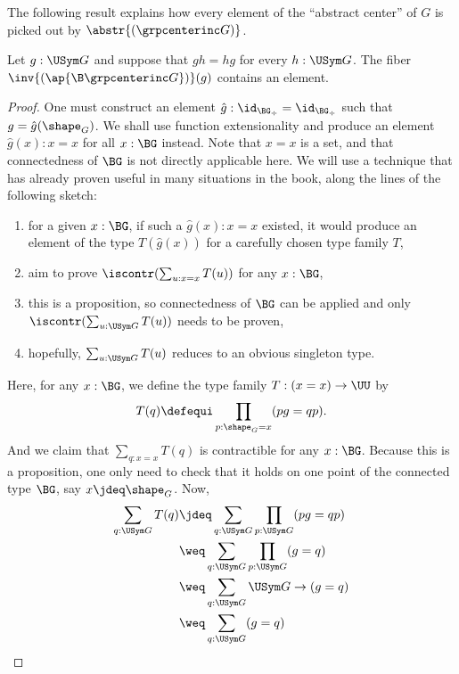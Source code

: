 The following result explains how every element of the ``abstract
center'' of $G$ is picked out by $\abstr{(\grpcenterinc G)}$.
\begin{lemma}
  \label{lemma:center-inc-surj-on-paths}%
  Let $g:\USym G$ and suppose that $gh=hg$ for every
  $h:\USym G$. The fiber $\inv{(\ap {\B\grpcenterinc G})}(g)$ contains
  an element.
\end{lemma}
\begin{proof}
  One must construct an element
  $\hat g:\id_{\BG_\div} = \id_{\BG_\div}$ such that
  $g=\hat g(\shape_G)$. We shall use function extensionality and produce
  an element $\hat g(x):x=x$ for all $x:\BG$ instead. Note that $x=x$
  is a set, and that connectedness of $\BG$ is not directly applicable
  here. We will use a technique that has already proven useful in many
  situations in the book, along the lines of the following sketch:
  \begin{enumerate}
  \item for a given $x:\BG$, if such a $\hat g(x):x=x$ existed, it would
    produce an element of the type $T(\hat g(x))$ for a carefully chosen type
    family $T$,
  \item aim to prove $\iscontr(\sum_{u:x=x}T(u))$ for any $x:\BG$,
  \item this is a proposition, so connectedness of $\BG$ can be applied
    and only $\iscontr(\sum_{u:\USym G}T(u))$ needs to be proven,
  \item hopefully, $\sum_{u:\USym G}T(u)$ reduces to an obvious
    singleton type.
  \end{enumerate}
  Here, for any $x:\BG$, we define the type family $T: (x=x) \to \UU$
  by
  \begin{displaymath}
    T(q) \defequi \prod_{p:\shape_G=x} (pg=qp).
  \end{displaymath}
  And we claim that $\sum_{q:x=x}T(q)$ is contractible for any
  $x:\BG$. Because this is a proposition, one only need to check that
  it holds on one point of the connected type $\BG$, say
  $x\jdeq \shape_G$. Now,
  \begin{displaymath}%
    \begin{aligned}
      \sum_{q:\USym G}T(q) &\jdeq
      \sum_{q:\USym G}\prod_{p:\USym G}(pg=qp)
      \\
      &\weq \sum_{q:\USym G}\prod_{p:\USym G}(g=q)
      \\
      &\weq \sum_{q:\USym G}\USym G\to (g=q)
      \\
      &\weq \sum_{q:\USym G} (g=q)
      \\

\end{aligned}
\end{displaymath}
\end{proof}
